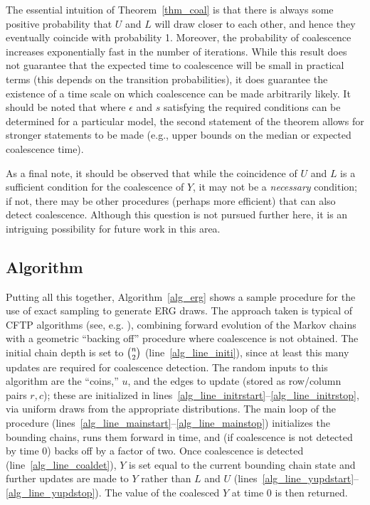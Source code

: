 \documentclass[11pt]{article}
\begin{document}
The essential intuition of Theorem~\ref{thm_coal} is that there is always some positive probability that $U$ and $L$ will draw closer to each other, and hence they eventually coincide with probability 1.  Moreover, the probability of coalescence increases exponentially fast in the number of iterations.  While this result does not guarantee that the expected time to coalescence will be small in practical terms (this depends on the transition probabilities), it does guarantee the existence of a time scale on which coalescence can be made arbitrarily likely.  It should be noted that where $\epsilon$ and $s$ satisfying the required conditions can be determined for a particular model, the second statement of the theorem allows for stronger statements to be made (e.g., upper bounds on the median or expected coalescence time). 

As a final note, it should be observed that while the coincidence of $U$ and $L$ is a sufficient condition for the coalescence of $Y$, it may not be a \emph{necessary} condition; if not, there may be other procedures (perhaps more efficient) that can also detect coalescence.  Although this question is not pursued further here, it is an intriguing possibility for future work in this area.

\subsection{Algorithm}

Putting all this together, Algorithm~\ref{alg_erg} shows a sample procedure for the use of exact sampling to generate ERG draws.  The approach taken is typical of CFTP algorithms (see, e.g. \citep{propp.wilson:rsa:1996}), combining forward evolution of the Markov chains with a geometric ``backing off'' procedure where coalescence is not obtained.  The initial chain depth is set to $\tbinom{n}{2}$ (line~\ref{alg_line_initi}), since at least this many updates are required for coalescence detection.  The random inputs to this algorithm are the ``coins,'' $u$, and the edges to update (stored as row/column pairs $r,c$); these are initialized in lines~\ref{alg_line_initrstart}--\ref{alg_line_initrstop}, via uniform draws from the appropriate distributions.  The main loop of the procedure (lines~\ref{alg_line_mainstart}--\ref{alg_line_mainstop}) initializes the bounding chains, runs them forward in time, and (if coalescence is not detected by time 0) backs off by a factor of two.  Once coalescence is detected (line~\ref{alg_line_coaldet}), $Y$ is set equal to the current bounding chain state and further updates are made to $Y$ rather than $L$ and $U$ (lines~\ref{alg_line_yupdstart}--\ref{alg_line_yupdstop}).  The value of the coalesced $Y$ at time 0 is then returned.
\end{document}
